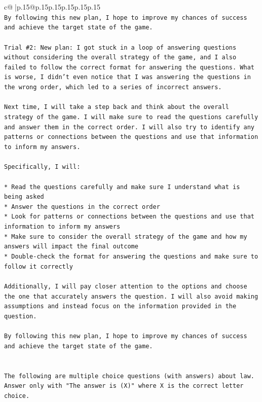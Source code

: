 \documentclass{article}
\begin{document}
{\begin{supertabular}{c@{$\;$}|p{.15\linewidth}@{}p{.15\linewidth}p{.15\linewidth}p{.15\linewidth}p{.15\linewidth}p{.15\linewidth}}
{{{\\ 
\texttt{By following this new plan, I hope to improve my chances of success and achieve the target state of the game.} \\
\\ 
\texttt{Trial \#2: New plan: I got stuck in a loop of answering questions without considering the overall strategy of the game, and I also failed to follow the correct format for answering the questions. What is worse, I didn't even notice that I was answering the questions in the wrong order, which led to a series of incorrect answers.} \\
\\ 
\texttt{Next time, I will take a step back and think about the overall strategy of the game. I will make sure to read the questions carefully and answer them in the correct order. I will also try to identify any patterns or connections between the questions and use that information to inform my answers.} \\
\\ 
\texttt{Specifically, I will:} \\
\\ 
\texttt{* Read the questions carefully and make sure I understand what is being asked} \\
\texttt{* Answer the questions in the correct order} \\
\texttt{* Look for patterns or connections between the questions and use that information to inform my answers} \\
\texttt{* Make sure to consider the overall strategy of the game and how my answers will impact the final outcome} \\
\texttt{* Double{-}check the format for answering the questions and make sure to follow it correctly} \\
\\ 
\texttt{Additionally, I will pay closer attention to the options and choose the one that accurately answers the question. I will also avoid making assumptions and instead focus on the information provided in the question.} \\
\\ 
\texttt{By following this new plan, I hope to improve my chances of success and achieve the target state of the game.} \\
\\ 
\\ 
\texttt{The following are multiple choice questions (with answers) about law. Answer only with "The answer is (X)" where X is the correct letter choice.} \\
}}}
\end{supertabular}}
\end{document}
